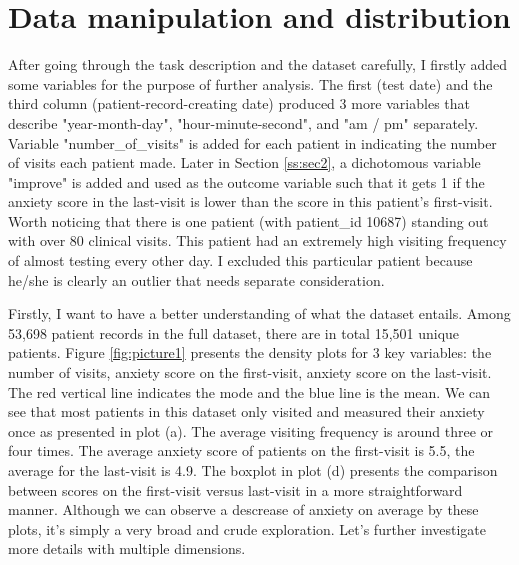 \documentclass[11pt]{article}
\begin{document}
\section{Data manipulation and distribution}

After going through the task description and the dataset carefully, I firstly added some variables for the purpose of further analysis. The first (test date) and the third column (patient-record-creating date) produced 3 more variables that describe "year-month-day", "hour-minute-second", and "am / pm" separately. Variable "number\_of\_visits" is added for each patient in indicating the number of visits each patient made. Later in Section \ref{ss:sec2}, a dichotomous variable "improve" is added and used as the outcome variable such that it gets 1 if the anxiety score in the last-visit is lower than the score in this patient's first-visit. Worth noticing that there is one patient (with patient\_id 10687) standing out with over 80 clinical visits. This patient had an extremely high visiting frequency of almost testing every other day. I excluded this particular patient because he/she is clearly an outlier that needs separate consideration.

Firstly, I want to have a better understanding of what the dataset entails. Among 53,698 patient records in the full dataset, there are in total 15,501 unique patients. Figure \ref{fig:picture1} presents the density plots for 3 key variables: the number of visits, anxiety score on the first-visit, anxiety score on the last-visit. The red vertical line indicates the mode and the blue line is the mean. We can see that most patients in this dataset only visited and measured their anxiety once as presented in plot (a). The average visiting frequency is around three or four times. The average anxiety score of patients on the first-visit is 5.5, the average for the last-visit is 4.9. The boxplot in plot (d) presents the comparison between scores on the first-visit versus last-visit in a more straightforward manner. Although we can observe a descrease of anxiety on average by these plots, it's simply a very broad and crude exploration. Let's further investigate more details with multiple dimensions.
\end{document}
